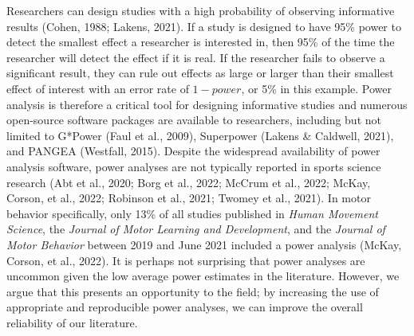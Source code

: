 \documentclass[
  doc, donotrepeattitle,floatsintext]{apa7}
\begin{document}
Researchers can design studies with a high probability of observing informative results (Cohen, 1988; Lakens, 2021). If a study is designed to have 95\% power to detect the smallest effect a researcher is interested in, then 95\% of the time the researcher will detect the effect if it is real. If the researcher fails to observe a significant result, they can rule out effects as large or larger than their smallest effect of interest with an error rate of \(1 - power\), or 5\% in this example. Power analysis is therefore a critical tool for designing informative studies and numerous open-source software packages are available to researchers, including but not limited to G*Power (Faul et al., 2009), Superpower (Lakens \& Caldwell, 2021), and PANGEA (Westfall, 2015). Despite the widespread availability of power analysis software, power analyses are not typically reported in sports science research (Abt et al., 2020; Borg et al., 2022; McCrum et al., 2022; McKay, Corson, et al., 2022; Robinson et al., 2021; Twomey et al., 2021). In motor behavior specifically, only 13\% of all studies published in \emph{Human Movement Science}, the \emph{Journal of Motor Learning and Development}, and the \emph{Journal of Motor Behavior} between 2019 and June 2021 included a power analysis (McKay, Corson, et al., 2022). It is perhaps not surprising that power analyses are uncommon given the low average power estimates in the literature. However, we argue that this presents an opportunity to the field; by increasing the use of appropriate and reproducible power analyses, we can improve the overall reliability of our literature.
\end{document}
